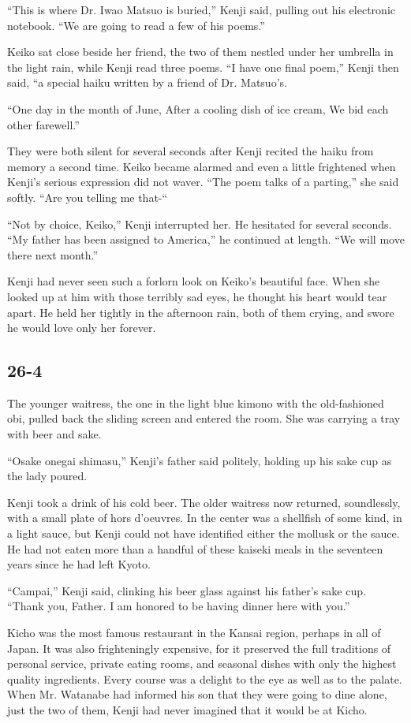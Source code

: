 \documentclass[]{article}
\begin{document}
{“This is where Dr. Iwao Matsuo is buried,” Kenji said, pulling out his electronic notebook. “We are going to read a few of his poems.”

Keiko sat close beside her friend, the two of them nestled under her umbrella in the light rain, while Kenji read three poems. “I have one final poem,” Kenji then said, “a special haiku written by a friend of Dr. Matsuo’s.

“One day in the month of June, After a cooling dish of ice cream, We bid each other farewell.”

They were both silent for several seconds after Kenji recited the haiku from memory a second time. Keiko became alarmed and even a little frightened when Kenji’s serious expression did not waver. “The poem talks of a parting,” she said softly. “Are you telling me that-“

“Not by choice, Keiko,” Kenji interrupted her. He hesitated for several seconds. “My father has been assigned to America,” he continued at length. “We will move there next month.”

Kenji had never seen such a forlorn look on Keiko’s beautiful face. When she looked up at him with those terribly sad eyes, he thought his heart would tear apart. He held her tightly in the afternoon rain, both of them crying, and swore he would love only her forever.


\subsection{26-4}

The younger waitress, the one in the light blue kimono with the old-fashioned obi, pulled back the sliding screen and entered the room. She was carrying a tray with beer and sake.

“Osake onegai shimasu,” Kenji’s father said politely, holding up his sake cup as the lady poured.

Kenji took a drink of his cold beer. The older waitress now returned, soundlessly, with a small plate of hors d’oeuvres. In the center was a shellfish of some kind, in a light sauce, but Kenji could not have identified either the mollusk or the sauce. He had not eaten more than a handful of these kaiseki meals in the seventeen years since he had left Kyoto.

“Campai,” Kenji said, clinking his beer glass against his father’s sake cup. “Thank you, Father. I am honored to be having dinner here with you.”

Kicho was the most famous restaurant in the Kansai region, perhaps in all of Japan. It was also frighteningly expensive, for it preserved the full traditions of personal service, private eating rooms, and seasonal dishes with only the highest quality ingredients. Every course was a delight to the eye as well as to the palate. When Mr. Watanabe had informed his son that they were going to dine alone, just the two of them, Kenji had never imagined that it would be at Kicho.

}
\end{document}
